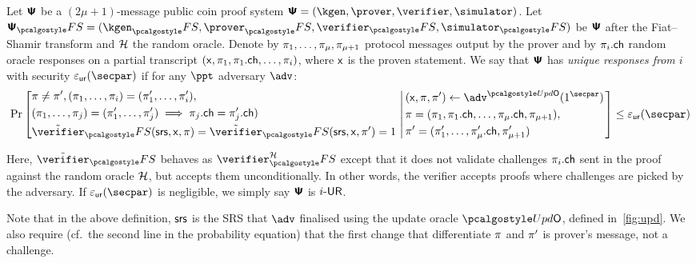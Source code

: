 \begin{definition}
	\label{def:wiuru}
	Let $\bm{\mathsf{\Psi}}$ be a $(2\mu + 1)$-message public coin proof system
  $\ps = (\kgen, \prover, \verifier, \simulator)$. Let
  $\proofsystem_\fs = (\kgen_\fs, \prover_\fs, \verifier_\fs, \simulator_\fs)$ be
  $\bm{\mathsf{\Psi}}$ after the Fiat--Shamir transform and $\mathcal{H}$ the random oracle. Denote
  by $\pi_1, \ldots, \pi_{\mu}, \pi_{\mu + 1}$ protocol messages
  output by the prover and by $\pi_i.\mathsf{ch}$ random oracle responses on a partial
  transcript
  $(\mathsf{x}, \pi_1, \pi_1.\mathsf{ch}, \ldots, \pi_i)$,
  where $\mathsf{x}$ is the proven statement. We say that $\bm{\mathsf{\Psi}}$ has \emph{unique
    responses from $i$} with security $\epsur(\secpar)$ if for any $\ppt$ adversary $\adv$:
  \[
	\Pr\left[
	\begin{aligned}
	& \zkproof \neq \zkproof', (\zkproof_1, \ldots, \zkproof_{i}) = (\zkproof'_1,
	\ldots, \zkproof'_{i}), \\
	& (\zkproof_{1}, \ldots, \zkproof_{j}) = (\zkproof'_{1}, \ldots, \zkproof'_{j}) \implies \zkproof_{j}.\ch = \zkproof'_{j}.\ch)\\
	& \tilde{\verifier}_\fs (\srs, \inp, \zkproof) =
	\tilde{\verifier}_\fs(\srs, \inp, \zkproof') = 1  \\
	\end{aligned}
	\,\left|\,
	\begin{aligned}
		& (\inp, \zkproof, \zkproof') \gets \adv^{\initU}(1^\secpar) \\
		& \zkproof = (\zkproof_1, \zkproof_1.\ch, \ldots, \zkproof_{\mu}.\ch, \zkproof_{\mu + 1}), \\
		& \zkproof' =  (\zkproof'_1, \ldots, \zkproof'_{\mu}.\ch, \zkproof'_{\mu + 1})
	\end{aligned}
	\right.\right] \leq \epsur(\secpar) 
	\]

	Here, $\tilde{\verifier}_\fs$ behaves as $\verifier^\ro_\fs$ except that it does not validate challenges $\pi_i.\mathsf{ch}$ sent in the proof against the random oracle $\mathcal{H}$, but accepts them unconditionally. In other words, the verifier accepts proofs where challenges are picked by the adversary. If $\epsur(\secpar)$ is negligible, we simply say $\bm{\mathsf{\Psi}}$ is ${i\text{-}\mathsf{UR}}$.
\end{definition}
%
Note that in the above definition, $\mathsf{srs}$ is the SRS that $\advse$ finalised using
the update oracle $\initU$, defined in~\cref{fig:upd}. We also require (cf.~the second line in the probability equation) that the first change that differentiate $\pi$ and $\pi'$ is prover's message, not a challenge. 

